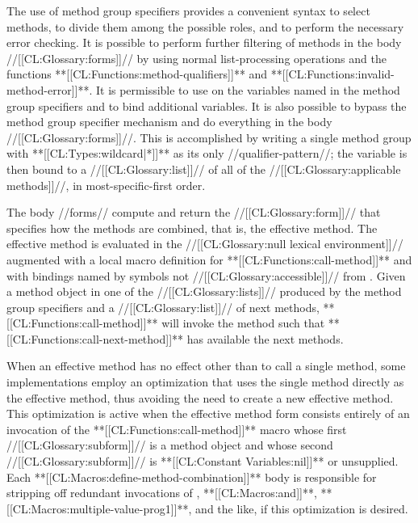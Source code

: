 The use of method group specifiers provides a convenient syntax to select methods, to divide them among the possible roles, and to perform the necessary error checking. It is possible to perform further filtering of methods in the body //[[CL:Glossary:forms]]// by using normal list-processing operations and the functions **[[CL:Functions:method-qualifiers]]** and **[[CL:Functions:invalid-method-error]]**. It is permissible to use  on the variables named in the method group specifiers and to bind additional variables. It is also possible to bypass the method group specifier mechanism and do everything in the body //[[CL:Glossary:forms]]//. This is accomplished by writing a single method group with **[[CL:Types:wildcard|*]]** as its only //qualifier-pattern//; the variable is then bound to a //[[CL:Glossary:list]]// of all of the //[[CL:Glossary:applicable methods]]//, in most-specific-first order.



The body //forms// compute and return the //[[CL:Glossary:form]]// that specifies how the methods are combined, that is, the effective method. The effective method is evaluated in the //[[CL:Glossary:null lexical environment]]// augmented with a local macro definition for **[[CL:Functions:call-method]]** and with bindings named by symbols not //[[CL:Glossary:accessible]]// from . Given a method object in one of the //[[CL:Glossary:lists]]// produced by the method group specifiers and a //[[CL:Glossary:list]]// of next methods, **[[CL:Functions:call-method]]** will invoke the method such that **[[CL:Functions:call-next-method]]** has available the next methods.

When an effective method has no effect other than to call a single method, some implementations employ an optimization that uses the single method directly as the effective method, thus avoiding the need to create a new effective method. This optimization is active when the effective method form consists entirely of an invocation of the **[[CL:Functions:call-method]]** macro whose first //[[CL:Glossary:subform]]// is a method object and whose second //[[CL:Glossary:subform]]// is **[[CL:Constant Variables:nil]]** or unsupplied. Each **[[CL:Macros:define-method-combination]]** body is responsible for stripping off redundant invocations of , **[[CL:Macros:and]]**, **[[CL:Macros:multiple-value-prog1]]**, and the like, if this optimization is desired.




